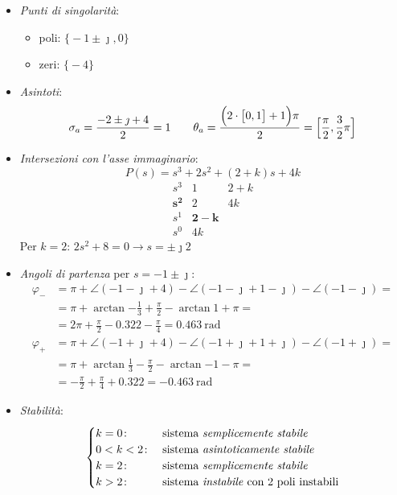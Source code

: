 \begin{esercizio}
\begin{itemize}
	\item \emph{Punti di singolarità}:
		\begin{itemize}
			\item poli: \(\bigl\{-1\pm\jmath,0\bigr\}\)
			\item zeri: \(\bigl\{-4\bigr\}\)
		\end{itemize}
	\item \emph{Asintoti}:
		\[
			\sigma_a = \frac{-2\pm\jmath+4}{2} = 1 \qquad
			\theta_a = \frac{\Bigl(2\cdot\bigl[0,1\bigr]+1\Bigr)\pi}{2} = \Bigl[\frac{\pi}{2},\frac{3}{2}\pi\Bigr]
		\]
	\item \emph{Intersezioni con l'asse immaginario}:
		\[
			P(s) = s^3 + 2s^2 +(2+k)s +4k
		\]
		\[\begin{array}{r|rr}
			s^3 & 1 & 2+k 	   \\
			\bm{s^2} & 2 & 4k  \\
			s^1 & \bm{2-k} 	   \\
			s^0 & 4k
		\end{array}\]
		Per \(k=2\): \(2s^2+8=0 \rightarrow s=\pm\jmath2\)
	\item \emph{Angoli di partenza} per \(s=-1\pm\jmath\):
		\begin{align*}
			\varphi_- &= \pi +\angle(-1-\jmath+4) -\angle(-1-\jmath+1-\jmath) -\angle(-1-\jmath) = \\
				  &= \pi +\arctan{-\frac{1}{3}} +\frac{\pi}{2} -\arctan{1} +\pi = \\
				  &= 2\pi +\frac{\pi}{2} -0.322 -\frac{\pi}{4} = \SI{0.463}{\radian} \\
			\varphi_+ &= \pi +\angle(-1+\jmath+4) -\angle(-1+\jmath+1+\jmath) -\angle(-1+\jmath) = \\
				  &= \pi +\arctan{\frac{1}{3}} -\frac{\pi}{2} -\arctan{-1} -\pi = \\
				  &= -\frac{\pi}{2} +\frac{\pi}{4} +0.322 = \SI{-0.463}{\radian}
		\end{align*}
	\item \emph{Stabilità}:
		\[\begin{cases}
			k = 0\colon & \text{sistema \emph{semplicemente stabile}} \\
			0 < k < 2\colon & \text{sistema \emph{asintoticamente stabile}} \\
			k = 2\colon & \text{sistema \emph{semplicemente stabile}} \\
			k > 2\colon & \text{sistema \emph{instabile} con 2 poli instabili}
		\end{cases}\]
\end{itemize}
\end{esercizio}

